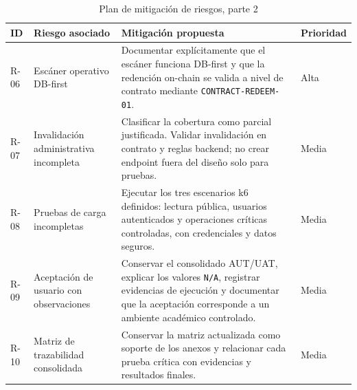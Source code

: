 \documentclass[12pt,letterpaper]{article}
\begin{document}
\begin{table}[H]
\centering
\begingroup
\scriptsize
\setlength{\tabcolsep}{2.5pt}
\renewcommand{\arraystretch}{1.18}

\begin{tabularx}{\textwidth}{|
>{\centering\arraybackslash}p{1.1cm}|
>{\raggedright\arraybackslash}p{3.5cm}|
>{\raggedright\arraybackslash}X|
>{\centering\arraybackslash}p{1.8cm}|}
\hline
\textbf{ID} & \textbf{Riesgo asociado} & \textbf{Mitigación propuesta} & \textbf{Prioridad} \\
\hline
R-06 & Escáner operativo DB-first & Documentar explícitamente que el escáner funciona DB-first y que la redención on-chain se valida a nivel de contrato mediante \texttt{CONTRACT-REDEEM-01}. & Alta \\
\hline
R-07 & Invalidación administrativa incompleta & Clasificar la cobertura como parcial justificada. Validar invalidación en contrato y reglas backend; no crear endpoint fuera del diseño solo para pruebas. & Media \\
\hline
R-08 & Pruebas de carga incompletas & Ejecutar los tres escenarios k6 definidos: lectura pública, usuarios autenticados y operaciones críticas controladas, con credenciales y datos seguros. & Media \\
\hline
R-09 & Aceptación de usuario con observaciones & Conservar el consolidado AUT/UAT, explicar los valores \texttt{N/A}, registrar evidencias de ejecución y documentar que la aceptación corresponde a un ambiente académico controlado. & Media \\
\hline
R-10 & Matriz de trazabilidad consolidada & Conservar la matriz actualizada como soporte de los anexos y relacionar cada prueba crítica con evidencias y resultados finales. & Media \\
\hline
\end{tabularx}

\endgroup
\caption{Plan de mitigación de riesgos, parte 2}
\label{tab:mitigacion-riesgos-2}
\end{table}
\end{document}
